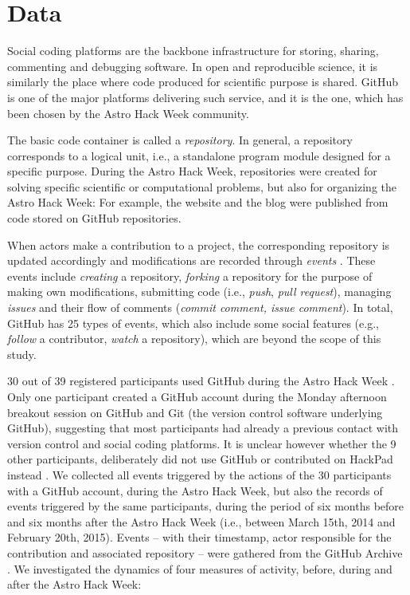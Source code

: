 \section{Data}
\label{sec:data}
Social coding platforms are the backbone infrastructure for storing, sharing, commenting and debugging software. In open and reproducible science, it is similarly the place where code produced for scientific purpose is shared. GitHub is one of the major platforms delivering such service, and it is the one, which has been chosen by the Astro Hack Week community.

The basic code container is called a {\it repository}. In general, a repository corresponds to a logical unit, i.e., a standalone program module designed for a specific purpose. During the Astro Hack Week, repositories were created for solving specific scientific or computational problems, but also for organizing the Astro Hack Week: For example, the website and the blog were published from code stored on GitHub repositories. 

When actors make a contribution to a project, the corresponding repository is updated accordingly and modifications are recorded through {\it events} \cite{github_event_types}. These events include {\it creating} a repository, {\it forking} a repository for the purpose of making own modifications, submitting code (i.e., {\it push}, {\it pull request}), managing {\it issues} and their flow of comments ({\it commit comment, issue comment}). In total, GitHub has 25 types of events, which also include some social features (e.g., {\it follow} a contributor, {\it watch} a repository), which are beyond the scope of this study.

30 out of 39 registered participants used GitHub during the Astro Hack Week \cite{astroweek_participants}. Only one participant created a GitHub account during the Monday afternoon breakout session on GitHub and Git (the version control software underlying GitHub), suggesting that most participants had already a previous contact with version control and social coding platforms. It is unclear however whether the 9 other participants, deliberately did not use GitHub or contributed on HackPad instead \cite{astro_hackpad}. We collected all events triggered by the actions of the 30 participants with a GitHub account, during the Astro Hack Week, but also the records of events triggered by the same participants, during the period of six months before and six months after the Astro Hack Week (i.e., between March 15th, 2014 and February 20th, 2015). Events -- with their timestamp, actor responsible for the contribution and associated repository -- were gathered from the GitHub Archive \cite{github_archive}. We investigated the dynamics of four measures of activity, before, during and after the Astro Hack Week:  

